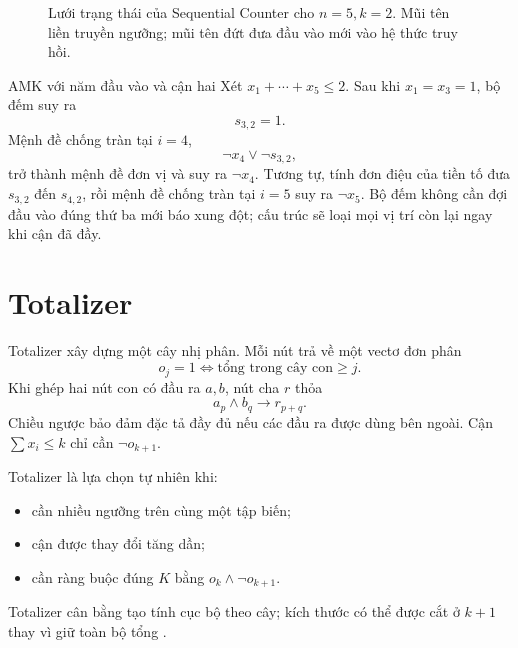 \begin{figure}[tb]
\centering
{}
\caption{Lưới trạng thái của Sequential Counter cho \(n=5,k=2\). Mũi tên liền
truyền ngưỡng; mũi tên đứt đưa đầu vào mới vào hệ thức truy hồi.}
\label{fig:seq-counter-grid}
\end{figure}

\begin{workedexample}{AMK với năm đầu vào và cận hai}
Xét \(x_1+\cdots+x_5\le2\). Sau khi \(x_1=x_3=1\), bộ đếm suy ra
\[
  s_{3,2}=1.
\]
Mệnh đề chống tràn tại \(i=4\),
\[
  \neg x_4\lor\neg s_{3,2},
\]
trở thành mệnh đề đơn vị và suy ra \(\neg x_4\). Tương tự, tính đơn điệu của
tiền tố đưa \(s_{3,2}\) đến \(s_{4,2}\), rồi mệnh đề chống tràn tại \(i=5\)
suy ra \(\neg x_5\). Bộ đếm không cần đợi đầu vào đúng thứ ba mới báo xung đột; cấu trúc sẽ
loại mọi vị trí còn lại ngay khi cận đã đầy.
\end{workedexample}

\section{Totalizer}

Totalizer xây dựng một cây nhị phân. Mỗi nút trả về một vectơ đơn phân
\[
  o_j=1\iff \text{tổng trong cây con}\ge j.
\]
Khi ghép hai nút con có đầu ra \(a,b\), nút cha \(r\) thỏa
\[
  a_p\land b_q\rightarrow r_{p+q}.
\]
Chiều ngược bảo đảm đặc tả đầy đủ nếu các đầu ra được dùng bên ngoài. Cận
\(\sum x_i\le k\) chỉ cần \(\neg o_{k+1}\).

Totalizer là lựa chọn tự nhiên khi:
\begin{itemize}
  \item cần nhiều ngưỡng trên cùng một tập biến;
  \item cận được thay đổi tăng dần;
  \item cần ràng buộc đúng \(K\) bằng \(o_k\land\neg o_{k+1}\).
\end{itemize}
Totalizer cân bằng tạo tính cục bộ theo cây; kích thước có thể được cắt ở
\(k+1\) thay vì giữ toàn bộ tổng \parencite{bailleux2003cardinality}.

